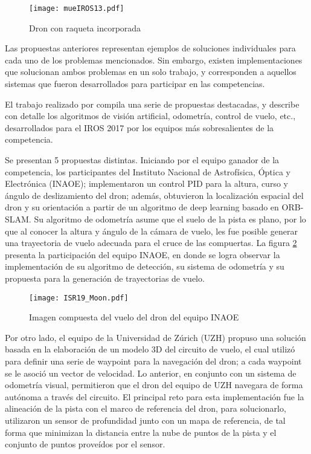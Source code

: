 \begin{figure}[ht]
    \centering
    \texttt{[image: mueIROS13.pdf]}
    \caption{Dron con raqueta incorporada \citet{mueller2013computationally}}
    \label{fig:mueIROS13}
\end{figure}

Las propuestas anteriores representan ejemplos de soluciones individuales para cada uno de los problemas mencionados. Sin embargo, existen implementaciones que solucionan ambos problemas en un solo trabajo, y corresponden a aquellos sistemas que fueron desarrollados para participar en las competencias.

El trabajo realizado por \citet{moon2019challenges} compila una serie de propuestas destacadas, y describe con detalle los algoritmos de visión artificial, odometría, control de vuelo, etc., desarrollados para el IROS 2017 por los equipos más sobresalientes de la competencia. 

Se presentan 5 propuestas distintas. Iniciando por el equipo ganador de la competencia, los participantes del Instituto Nacional de Astrofísica, Óptica y Electrónica (INAOE); implementaron un control PID para la altura, curso y ángulo de deslizamiento del dron; además, obtuvieron la localización espacial del dron y su orientación a partir de un algoritmo de  deep learning basado en ORB-SLAM. Su algoritmo de odometría asume que el suelo de la pista es plano, por lo que al conocer la altura y ángulo de la cámara de vuelo, les fue posible generar una trayectoria de vuelo adecuada para el cruce de las compuertas. La figura \ref{fig:ISR19_Moon} presenta la participación del equipo INAOE, en donde se logra observar la implementación de su algoritmo de detección, su sistema de odometría y su propuesta para la generación de trayectorias de vuelo.

\begin{figure}[ht]
    \centering
    \texttt{[image: ISR19\_Moon.pdf]}
    \caption{Imagen compuesta del vuelo del dron del equipo INAOE\citet{moon2019challenges}}
    \label{fig:ISR19_Moon}
\end{figure}


Por otro lado, el equipo de la Universidad de Zúrich (UZH) propuso una solución basada en la elaboración de un modelo 3D del circuito de vuelo, el cual utilizó para definir una serie de waypoint para la navegación del dron; a cada waypoint se le asoció un vector de velocidad. Lo anterior, en conjunto con un sistema de odometría visual, permitieron que el dron del equipo de UZH navegara de forma autónoma a través del circuito. 
El principal reto para esta implementación fue la alineación de la pista con el marco de referencia del dron, para solucionarlo, utilizaron  un sensor de profundidad junto con un mapa de referencia, de tal forma que minimizan la distancia entre la nube de puntos de la pista y el conjunto de puntos proveídos por el sensor.

